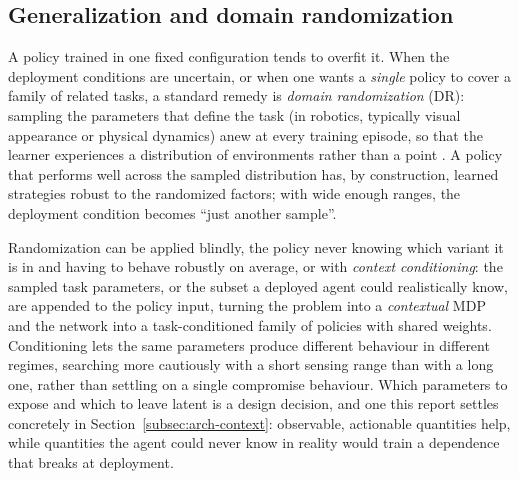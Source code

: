 \subsection{Generalization and domain randomization}
\label{subsec:bg-dr}

A policy trained in one fixed configuration tends to overfit it. When the
deployment conditions are uncertain, or when one wants a \emph{single} policy to
cover a family of related tasks, a standard remedy is \emph{domain randomization}
(DR): sampling the parameters that define the task (in robotics, typically visual
appearance or physical dynamics) anew at every training episode, so that the
learner experiences a distribution of environments rather than a point
\citep{tobin2017domain,peng2018sim}. A policy that performs well across the
sampled distribution has, by construction, learned strategies robust to the
randomized factors; with wide enough ranges, the deployment condition becomes
``just another sample''.

Randomization can be applied blindly, the policy never knowing which variant it
is in and having to behave robustly on average, or with \emph{context
conditioning}: the sampled task parameters, or the subset a deployed agent could
realistically know, are appended to the policy input, turning the problem into a
\emph{contextual} MDP \citep{hallak2015contextual} and the network into a
task-conditioned family of policies with shared weights. Conditioning lets the
same parameters produce different behaviour in different regimes, searching more
cautiously with a short sensing range than with a long one, rather than settling
on a single compromise behaviour. Which parameters to expose and which to leave
latent is a design decision, and one this report settles concretely in
Section~\ref{subsec:arch-context}: observable, actionable quantities help, while
quantities the agent could never know in reality would train a dependence that
breaks at deployment.
